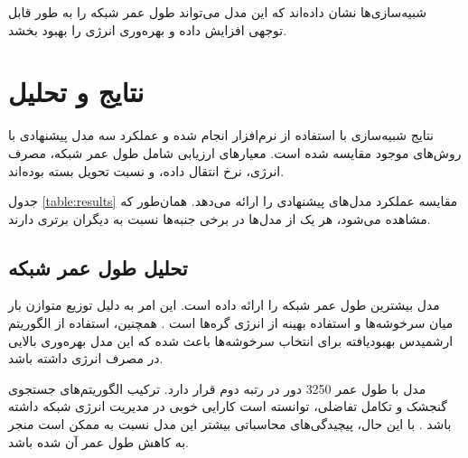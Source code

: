 \documentclass[12pt, onecolumn, a4paper]{article}
\begin{document}
شبیه‌سازی‌ها نشان داده‌اند که این مدل می‌تواند طول عمر شبکه را به طور قابل توجهی افزایش داده و بهره‌وری انرژی را بهبود بخشد.

\section{نتایج و تحلیل}

نتایج شبیه‌سازی با استفاده از نرم‌افزار  انجام شده و عملکرد سه مدل پیشنهادی با روش‌های موجود مقایسه شده است. معیارهای ارزیابی شامل طول عمر شبکه، مصرف انرژی، نرخ انتقال داده، و نسبت تحویل بسته بوده‌اند. 

جدول \ref{table:results} مقایسه عملکرد مدل‌های پیشنهادی را ارائه می‌دهد. همان‌طور که مشاهده می‌شود، هر یک از مدل‌ها در برخی جنبه‌ها نسبت به دیگران برتری دارند. 

\begin{table}[h!]
	\centering
	\caption{مقایسه عملکرد مدل‌های پیشنهادی}
	\label{table:results}
\end{table}

\subsection*{تحلیل طول عمر شبکه}
مدل  بیشترین طول عمر شبکه را ارائه داده است. این امر به دلیل توزیع متوازن بار میان سرخوشه‌ها و استفاده بهینه از انرژی گره‌ها است \cite{ref4, ref5}. همچنین، استفاده از الگوریتم ارشمیدس بهبودیافته برای انتخاب سرخوشه‌ها باعث شده که این مدل بهره‌وری بالایی در مصرف انرژی داشته باشد. 

مدل  با طول عمر 3250 دور در رتبه دوم قرار دارد. ترکیب الگوریتم‌های جستجوی گنجشک و تکامل تفاضلی، توانسته است کارایی خوبی در مدیریت انرژی شبکه داشته باشد \cite{ref6}. با این حال، پیچیدگی‌های محاسباتی بیشتر این مدل نسبت به  ممکن است منجر به کاهش طول عمر آن شده باشد.
\end{document}
